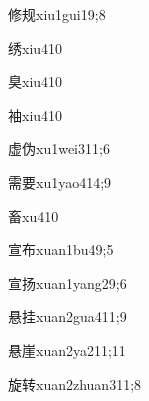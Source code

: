 \begin{verbete}{修规}{xiu1gui1}{9;8}
\end{verbete}

\begin{verbete}{绣}{xiu4}{10}
\end{verbete}

\begin{verbete}{臭}{xiu4}{10}
\end{verbete}

\begin{verbete}{袖}{xiu4}{10}
\end{verbete}

\begin{verbete}{虚伪}{xu1wei3}{11;6}
\end{verbete}

\begin{verbete}{需要}{xu1yao4}{14;9}
\end{verbete}

\begin{verbete}{畜}{xu4}{10}
\end{verbete}

\begin{verbete}{宣布}{xuan1bu4}{9;5}
\end{verbete}

\begin{verbete}{宣扬}{xuan1yang2}{9;6}
\end{verbete}

\begin{verbete}{悬挂}{xuan2gua4}{11;9}
\end{verbete}

\begin{verbete}{悬崖}{xuan2ya2}{11;11}
\end{verbete}

\begin{verbete}{旋转}{xuan2zhuan3}{11;8}
\end{verbete}


